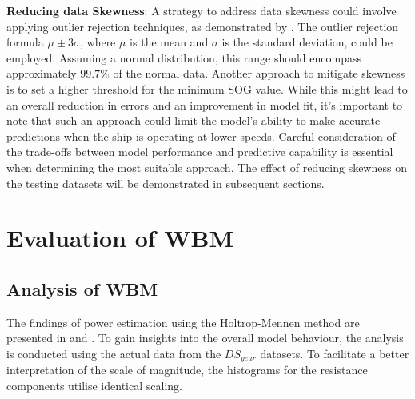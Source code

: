 \textbf{Reducing data Skewness}: A strategy to address data skewness could involve applying outlier rejection techniques, as demonstrated by \citet{Gkerekos.2019}. The outlier rejection formula $\mu \pm 3\sigma$, where $\mu$ is the mean and $\sigma$ is the standard deviation, could be employed. Assuming a normal distribution, this range should encompass approximately $99.7\%$ of the normal data. Another approach to mitigate skewness is to set a higher threshold for the minimum SOG value. While this might lead to an overall reduction in errors and an improvement in model fit, it's important to note that such an approach could limit the model's ability to make accurate predictions when the ship is operating at lower speeds. Careful consideration of the trade-offs between model performance and predictive capability is essential when determining the most suitable approach. The effect of reducing skewness on the testing datasets will be demonstrated in subsequent sections.\\

\section{Evaluation of WBM}\label{sec:WBM_perf_eval}

\subsection{Analysis of WBM}\label{sec:Power_estimation_actual}

The findings of power estimation using the Holtrop-Mennen method are presented in  and . To gain insights into the overall model behaviour, the analysis is conducted using the actual data from the $DS_{year}$ datasets. To facilitate a better interpretation of the scale of magnitude, the histograms for the resistance components utilise identical scaling.\\

